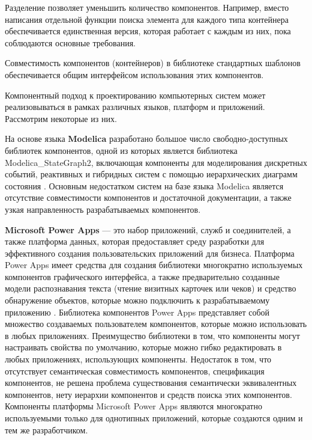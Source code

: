 Разделение позволяет уменьшить количество компонентов. Например, вместо написания отдельной функции поиска элемента для каждого типа контейнера обеспечивается единственная версия, которая работает с каждым из них, пока соблюдаются основные требования.

Совместимость компонентов (контейнеров) в библиотеке стандартных шаблонов обеспечивается общим интерфейсом использования этих компонентов.

Компонентный подход к проектированию компьютерных систем может реализовываться в рамках различных языков, платформ и приложений. Рассмотрим некоторые из них.

На основе языка \textbf{Modelica} разработано большое число свободно-доступных библиотек компонентов, одной из которых является библиотека Modelica\_StateGraph2, включающая компоненты для моделирования дискретных событий, реактивных и гибридных систем с помощью иерархических диаграмм состояния . Основным недостатком систем на базе языка Modelica является отсутствие совместимости компонентов и достаточной документации, а также узкая направленность разрабатываемых компонентов.

\textbf{Microsoft Power Apps} — это набор приложений, служб и соединителей, а также платформа данных, которая предоставляет среду разработки для эффективного создания пользовательских приложений для бизнеса. Платформа Power Apps имеет средства для создания библиотеки многократно используемых компонентов графического интерфейса, а также предварительно созданные модели распознавания текста (чтение визитных карточек или чеков) и средство обнаружение объектов, которые можно подключить к разрабатываемому приложению . Библиотека компонентов Power Apps представляет собой множество создаваемых пользователем компонентов, которые можно использовать в любых приложениях. Преимущество библиотеки в том, что компоненты могут настраивать свойства по умолчанию, которые можно гибко редактировать в любых приложениях, использующих компоненты. Недостаток в том, что отсутствует семантическая совместимость компонентов, спецификация компонентов, не решена проблема существования семантически эквивалентных компонентов, нету иерархии компонентов и средств поиска этих компонентов. Компоненты платформы Microsoft Power Apps являются многократно используемыми только для однотипных приложений, которые создаются одним и тем же разработчиком.

